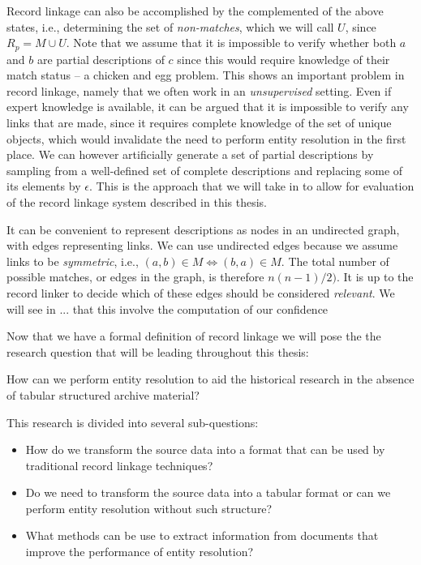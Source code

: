 Record linkage can also be accomplished by the complemented of the above states, i.e., determining the set of \emph{non-matches}, which we will call $U$, since $R_{p} = M \cup U$.
Note that we assume that it is impossible to verify whether both $a$ and $b$ are partial descriptions of $c$ since this would require knowledge of their match status -- a chicken and egg problem.
This shows an important problem in record linkage, namely that we often work in an \emph{unsupervised} setting.
Even if expert knowledge is available, it can be argued that it is impossible to verify any links that are made, since it requires complete knowledge of the set of unique objects, which would invalidate the need to perform entity resolution in the first place.
We can however artificially generate a set of partial descriptions by sampling from a well-defined set of complete descriptions and replacing some of its elements by $\epsilon$.
This is the approach that we will take in  to allow for evaluation of the record linkage system described in this thesis.

It can be convenient to represent descriptions as nodes in an undirected graph, with edges representing links.
We can use undirected edges because we assume links to be \emph{symmetric}, i.e., $(a, b) \in M \Leftrightarrow (b, a) \in M$.
The total number of possible matches, or edges in the graph, is therefore $n(n-1)/2)$.
It is up to the record linker to decide which of these edges should be considered \emph{relevant}.
We will see in ...  that this involve the computation of our confidence 

Now that we have a formal definition of record linkage we will pose the the research question that will be leading throughout this thesis:

\begin{question*}
    How can we perform entity resolution to aid the historical research in the absence of tabular structured archive material?
\end{question*}

This research is divided into several sub-questions:

\begin{itemize}
    \item How do we transform the source data into a format that can be used by traditional record linkage techniques?
    \item Do we need to transform the source data into a tabular format or can we perform entity resolution without such structure?
    \item What methods can be use to extract information from documents that improve the performance of entity resolution?
\end{itemize}


